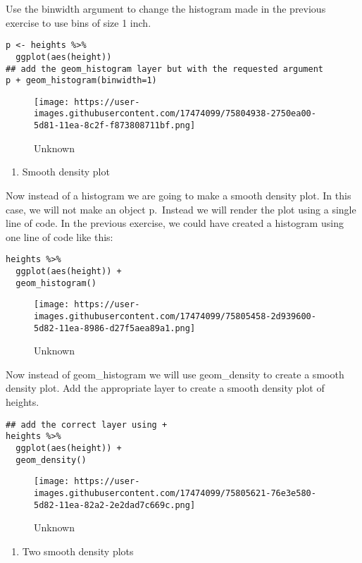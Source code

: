 \documentclass[]{article}
\providecommand{\tightlist}{%
  \setlength{\itemsep}{0pt}\setlength{\parskip}{0pt}}
\begin{document}
Use the binwidth argument to change the histogram made in the previous
exercise to use bins of size 1 inch.

\begin{verbatim}
p <- heights %>% 
  ggplot(aes(height))
## add the geom_histogram layer but with the requested argument
p + geom_histogram(binwidth=1)
\end{verbatim}

\begin{figure}
\centering
\texttt{[image: https://user-images.githubusercontent.com/17474099/75804938-2750ea00-5d81-11ea-8c2f-f873808711bf.png]}
\caption{Unknown}
\end{figure}

\begin{enumerate}
\def\labelenumi{\arabic{enumi}.}
\setcounter{enumi}{18}
\tightlist
\item
  Smooth density plot
\end{enumerate}

Now instead of a histogram we are going to make a smooth density plot.
In this case, we will not make an object p.~Instead we will render the
plot using a single line of code. In the previous exercise, we could
have created a histogram using one line of code like this:

\begin{verbatim}
heights %>% 
  ggplot(aes(height)) +
  geom_histogram()
\end{verbatim}

\begin{figure}
\centering
\texttt{[image: https://user-images.githubusercontent.com/17474099/75805458-2d939600-5d82-11ea-8986-d27f5aea89a1.png]}
\caption{Unknown}
\end{figure}

Now instead of geom\_histogram we will use geom\_density to create a
smooth density plot. Add the appropriate layer to create a smooth
density plot of heights.

\begin{verbatim}
## add the correct layer using +
heights %>% 
  ggplot(aes(height)) +
  geom_density()
\end{verbatim}

\begin{figure}
\centering
\texttt{[image: https://user-images.githubusercontent.com/17474099/75805621-76e3e580-5d82-11ea-82a2-2e2dad7c669c.png]}
\caption{Unknown}
\end{figure}

\begin{enumerate}
\def\labelenumi{\arabic{enumi}.}
\setcounter{enumi}{19}
\tightlist
\item
  Two smooth density plots
\end{enumerate}
\end{document}
